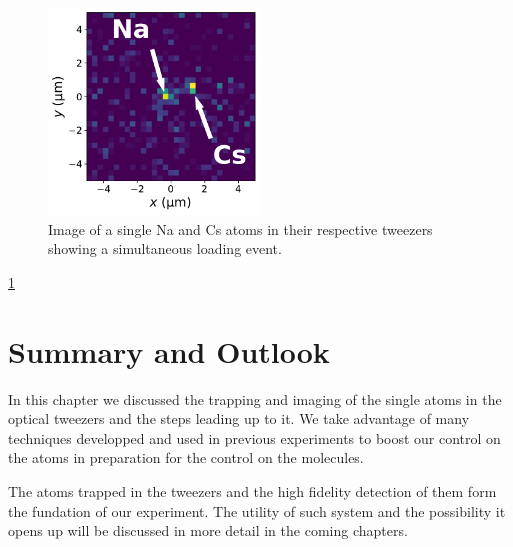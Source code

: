 \begin{figure}
  \centering
  \includegraphics[width=0.5\textwidth]{figures/loading_single_atoms.pdf}
  \caption[Image of single Na and Cs atoms.]{
    Image of a single Na and Cs atoms in their respective tweezers
    showing a simultaneous loading event.
    \label{fig:loading:loading:single-atoms}}
\end{figure}

\ref{fig:loading:loading:single-atoms}


\section{Summary and Outlook}
\label{ch:loading:summary}


In this chapter we discussed the trapping and imaging of the single atoms in the optical
tweezers and the steps leading up to it.
We take advantage of many techniques developped and used in previous experiments
to boost our control on the atoms in preparation for the control on the molecules.

The atoms trapped in the tweezers and the high fidelity detection of them
form the fundation of our experiment.
The utility of such system and the possibility it opens up will be discussed
in more detail in the coming chapters.
